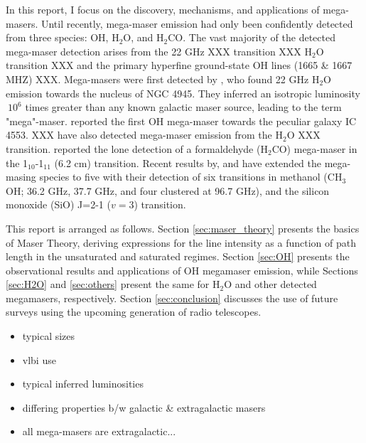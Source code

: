 In this report, I focus on the discovery, mechanisms, and applications of mega-masers. Until recently, mega-maser emission had only been confidently detected from three species: OH, H$_2$O, and H$_2$CO. The vast majority of the detected mega-maser detection arises from the 22 GHz XXX transition XXX H$_2$O transition XXX and the primary hyperfine ground-state OH lines (1665 \& 1667 MHZ) XXX. Mega-masers were first detected by \citet{DOS_SANTOS_1979}, who found 22 GHz H$_2$O emission towards the nucleus of NGC 4945. They inferred an isotropic luminosity $~10^6$ times greater than any known galactic maser source, leading to the term "mega"-maser. \citet{Baan_1982} reported the first OH mega-maser towards the peculiar galaxy IC 4553. XXX have also detected mega-maser emission from the H$_2$O XXX transition. \citet{baan1986} reported the lone detection of a formaldehyde (H$_2$CO) mega-maser in the 1$_{10}$-1$_{11}$ (6.2 cm) transition. Recent results by, \citet{wang2014} and \citet{chen2015} have extended the mega-masing species to five with their detection of six transitions in methanol (CH$_3$OH; 36.2 GHz, 37.7 GHz, and four clustered at 96.7 GHz), and the silicon monoxide (SiO) J=2-1  ($v=3$) transition. 

This report is arranged as follows. Section \ref{sec:maser_theory} presents the basics of Maser Theory, deriving expressions for the line intensity as a function of path length in the unsaturated and saturated regimes. Section \ref{sec:OH} presents the observational results and applications of OH megamaser emission, while Sections \ref{sec:H2O} and \ref{sec:others} present the same for H$_2$O and other detected megamasers, respectively. Section \ref{sec:conclusion} discusses the use of future surveys using the upcoming generation of radio telescopes.

\begin{itemize}
\item typical sizes
\item vlbi use
\item typical inferred luminosities
\item differing properties b/w galactic & extragalactic masers
\item all mega-masers are extragalactic...
\end{itemize}